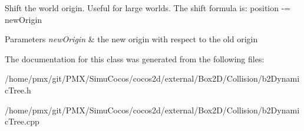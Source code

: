 Shift the world origin. Useful for large worlds. The shift formula is\+: position -\/= new\+Origin 
\begin{DoxyParams}{Parameters}
{\em new\+Origin} & the new origin with respect to the old origin \\
\hline
\end{DoxyParams}


The documentation for this class was generated from the following files\+:\begin{DoxyCompactItemize}
\item 
/home/pmx/git/\+P\+M\+X/\+Simu\+Cocos/cocos2d/external/\+Box2\+D/\+Collision/b2\+Dynamic\+Tree.\+h\item 
/home/pmx/git/\+P\+M\+X/\+Simu\+Cocos/cocos2d/external/\+Box2\+D/\+Collision/b2\+Dynamic\+Tree.\+cpp\end{DoxyCompactItemize}
